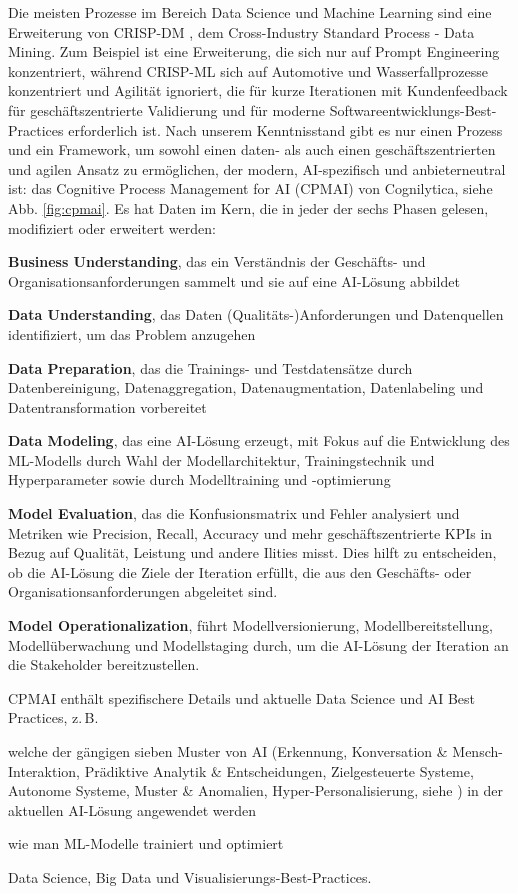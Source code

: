 \documentclass[twocolumn]{article}
\begin{document}
Die meisten Prozesse im Bereich Data Science und Machine Learning sind eine Erweiterung von CRISP-DM \cite{CRISP99}, dem Cross-Industry Standard Process - Data Mining. Zum Beispiel ist \cite{Farago23} eine Erweiterung, die sich nur auf Prompt Engineering konzentriert, während CRISP-ML \cite{Studer21} sich auf Automotive und Wasserfallprozesse konzentriert und Agilität ignoriert, die für kurze Iterationen mit Kundenfeedback für geschäftszentrierte Validierung und für moderne Softwareentwicklungs-Best-Practices erforderlich ist. Nach unserem Kenntnisstand gibt es nur einen Prozess und ein Framework, um sowohl einen daten- als auch einen geschäftszentrierten und agilen Ansatz zu ermöglichen, der modern, AI-spezifisch und anbieterneutral ist: das Cognitive Process Management for AI (CPMAI) von Cognilytica, siehe Abb. \ref{fig:cpmai}. Es hat Daten im Kern, die in jeder der sechs Phasen gelesen, modifiziert oder erweitert werden:
\begin{compactitem}
\item \textbf{Business Understanding}, das ein Verständnis der Geschäfts- und Organisationsanforderungen sammelt und sie auf eine AI-Lösung abbildet
\item \textbf{Data Understanding}, das Daten (Qualitäts-)Anforderungen und Datenquellen identifiziert, um das Problem anzugehen
\item \textbf{Data Preparation}, das die Trainings- und Testdatensätze durch Datenbereinigung, Datenaggregation, Datenaugmentation, Datenlabeling und Datentransformation vorbereitet
\item \textbf{Data Modeling}, das eine AI-Lösung erzeugt, mit Fokus auf die Entwicklung des ML-Modells durch Wahl der Modellarchitektur, Trainingstechnik und Hyperparameter sowie durch Modelltraining und -optimierung
\item \textbf{Model Evaluation}, das die Konfusionsmatrix und Fehler analysiert und Metriken wie Precision, Recall, Accuracy und mehr geschäftszentrierte KPIs in Bezug auf Qualität, Leistung und andere Ilities misst. Dies hilft zu entscheiden, ob die AI-Lösung die Ziele der Iteration erfüllt, die aus den Geschäfts- oder Organisationsanforderungen abgeleitet sind.
\item \textbf{Model Operationalization}, führt Modellversionierung, Modellbereitstellung, Modellüberwachung und Modellstaging durch, um die AI-Lösung der Iteration an die Stakeholder bereitzustellen.
\end{compactitem}

CPMAI enthält spezifischere Details und aktuelle Data Science und AI Best Practices, z.\,B.
\begin{compactitem}
\item welche der gängigen sieben Muster von AI (Erkennung, Konversation \& Mensch-Interaktion, Prädiktive Analytik \& Entscheidungen, Zielgesteuerte Systeme, Autonome Systeme, Muster \& Anomalien, Hyper-Personalisierung, siehe \cite{Cognilytica}) in der aktuellen AI-Lösung angewendet werden
\item wie man ML-Modelle trainiert und optimiert
\item Data Science, Big Data und Visualisierungs-Best-Practices.
\end{compactitem}
\end{document}
